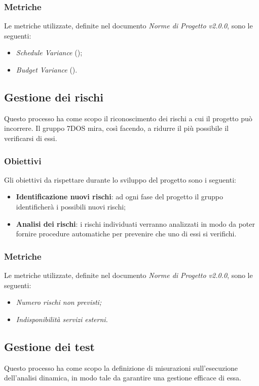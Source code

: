 \subsubsection{Metriche}
Le metriche utilizzate, definite nel documento \emph{Norme di Progetto v2.0.0}, sono le seguenti:
\begin{itemize}
			\item{\emph{Schedule Variance} ();}
			\item{\emph{Budget Variance} ().}
\end{itemize}

\subsection{Gestione dei rischi}
Questo processo ha come scopo il riconoscimento dei rischi a cui il progetto può incorrere. Il gruppo 7DOS mira, così facendo, a ridurre il più possibile il verificarsi di essi.
\subsubsection{Obiettivi} 
Gli obiettivi da rispettare durante lo sviluppo del progetto sono i seguenti:
\begin{itemize}
	\item{\textbf{Identificazione nuovi rischi}: ad ogni fase del progetto il gruppo identificherà i possibili nuovi rischi;}
	\item{\textbf{Analisi dei rischi}: i rischi individuati verranno analizzati in modo da poter fornire procedure automatiche per prevenire che uno di essi si verifichi.}
\end{itemize}
\subsubsection{Metriche}
Le metriche utilizzate, definite nel documento \emph{Norme di Progetto v2.0.0}, sono le seguenti:
\begin{itemize}
	\item\emph{Numero rischi non previsti;}
	\item\emph{Indisponibilità servizi esterni.}
\end{itemize}

\subsection{Gestione dei test}
Questo processo ha come scopo la definizione di misurazioni sull'esecuzione dell'analisi dinamica, in modo tale da garantire una gestione efficace di essa.

